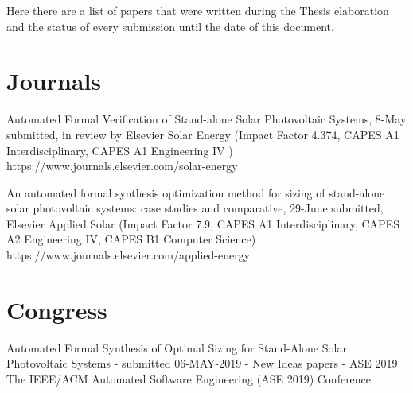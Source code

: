 %
Here there are a list of papers that were written during the Thesis elaboration and the status of every submission until the date of this document.

\section{Journals}

Automated Formal Verification of Stand-alone Solar Photovoltaic Systems, 8-May submitted, in review by Elsevier Solar Energy (Impact Factor 4.374, CAPES A1 Interdisciplinary, CAPES A1 Engineering IV ) https://www.journals.elsevier.com/solar-energy

An automated formal synthesis optimization method for sizing of stand-alone solar photovoltaic systems: case studies and comparative, 29-June submitted, Elsevier Applied Solar (Impact Factor 7.9, CAPES A1 Interdisciplinary, CAPES A2 Engineering IV, CAPES B1 Computer Science) https://www.journals.elsevier.com/applied-energy


\section{Congress}

Automated Formal Synthesis of Optimal Sizing for Stand-Alone Solar Photovoltaic Systems - submitted 06-MAY-2019 - New Ideas papers - ASE 2019 The IEEE/ACM Automated Software Engineering (ASE 2019) Conference